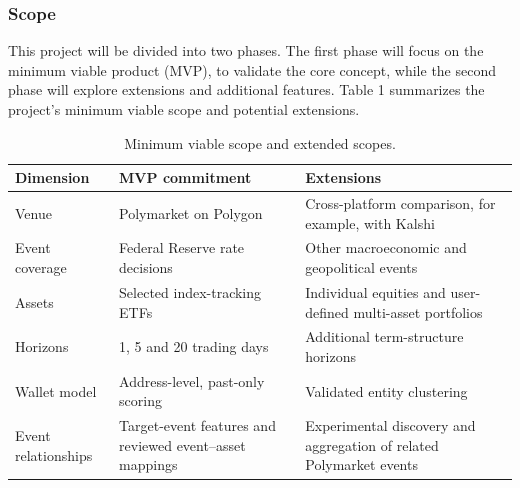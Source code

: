 \clearpage
\subsubsection{Scope}

This project will be divided into two phases. The first phase will focus on the minimum viable product (MVP), to validate the core concept, while the second phase will explore extensions and additional features. Table 1 summarizes the project's minimum viable scope and potential extensions.


\begin{table}[H]
\smalltable
{}
\caption{Minimum viable scope and extended scopes.}
\begin{tabularx}{\linewidth}{|L{30mm}|Y|Y|}
\hline
{}\textbf{Dimension} & \textbf{MVP commitment} & \textbf{Extensions} \\
\hline
Venue & Polymarket on Polygon & Cross-platform comparison, for example, with Kalshi \\
\hline
Event coverage & Federal Reserve rate decisions & Other macroeconomic and geopolitical events \\
\hline
Assets & Selected index-tracking ETFs & Individual equities and user-defined multi-asset portfolios \\
\hline
Horizons & 1, 5 and 20 trading days & Additional term-structure horizons \\
\hline
Wallet model & Address-level, past-only scoring & Validated entity clustering \\
\hline
Event relationships & Target-event features and reviewed event--asset mappings & Experimental discovery and aggregation of related Polymarket events \\
\hline
\end{tabularx}
\end{table}
